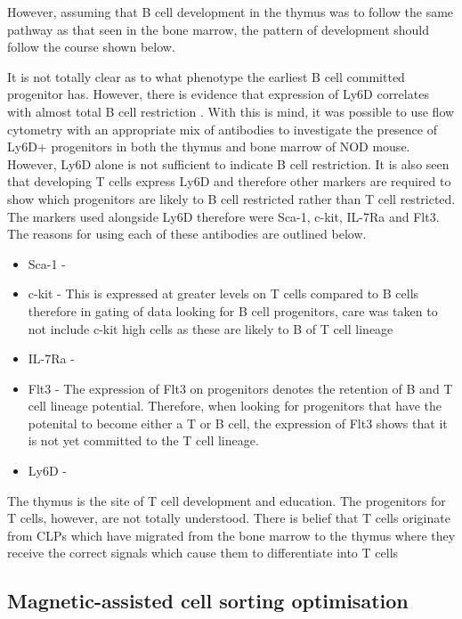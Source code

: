  However, assuming that B cell development in the thymus was to follow the same pathway as that seen in the bone marrow, the pattern of development should follow the course shown below.

 


 It is not totally clear as to what phenotype the earliest B cell committed progenitor has. 
 However, there is evidence that expression of Ly6D correlates with almost total B cell restriction .
 With this is mind, it was possible to use flow cytometry with an appropriate mix of antibodies to investigate the presence of Ly6D+ progenitors in both the thymus and bone marrow of NOD mouse.
However, Ly6D alone is not sufficient to indicate B cell restriction. 
It is also seen that developing T cells express Ly6D and therefore other markers are required to show which progenitors are likely to B cell restricted rather than T cell restricted.
The markers used alongside Ly6D therefore were Sca-1, c-kit, IL-7Ra and Flt3. 
The reasons for using each of these antibodies are outlined below.
\begin{itemize}
\item Sca-1 - 
\item c-kit - This is expressed at greater levels on T cells compared to B cells therefore in gating of data looking for B cell progenitors, care was taken to not include c-kit high cells as these are likely to B of T cell lineage  
\item IL-7Ra - 
\item Flt3 - The expression of Flt3 on progenitors denotes the retention of B and T cell lineage potential. Therefore, when looking for progenitors that have the potenital to become either a T or B cell, the expression of Flt3 shows that it is not yet committed to the T cell lineage.
\item Ly6D - 
\end{itemize}




The thymus is the site of T cell development and education.
The progenitors for T cells, however, are not totally understood. 
There is belief that T cells originate from CLPs which have migrated from the bone marrow to the thymus where they receive the correct signals which cause them to differentiate into T cells
\subsection{Magnetic-assisted cell sorting optimisation}

